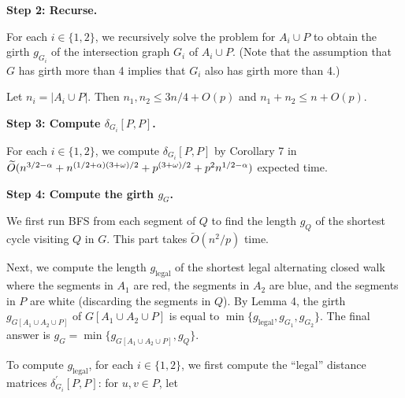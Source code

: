 \par\medskip\noindent\textbf{Step 2: Recurse.}\par
For each $i\in\{1,2\}$, we recursively solve the problem for $A_{i}\cup P$ to obtain the girth $g_{G_{i}}$ of the intersection graph $G_{i}$ of $A_{i}\cup P$. (Note that the assumption that $G$ has girth more than 4 implies that $G_{i}$ also has girth more than 4.)
\par
\par
Let $n_{i}=|A_{i}\cup P|$. Then $n_{1},n_{2}\leq 3n/4+O(p)$ and $n_{1}+n_{2}\leq n+O(p)$.
\par
\par
\par\medskip\noindent\textbf{Step 3: Compute $\delta_{G_{i}}[P,P]$.}\par
For each $i\in\{1,2\}$, we compute $\delta_{G_{i}}[P,P]$ by Corollary 7 in $\widetilde{O}(n^{3/2-\alpha}+n^{(1/2+\alpha)(3+\omega)/2}+p^{(3+\omega)/2}+p^{%
2}n^{1/2-\alpha})$ expected time.
\par
\par
\par\medskip\noindent\textbf{Step 4: Compute the girth $g_{G}$.}\par
We first run BFS from each segment of $Q$ to find the length $g_{Q}$ of the shortest cycle visiting $Q$ in $G$. This part takes $\widetilde{O}(n^{2}/p)$ time.
\par
\par
Next, we compute the length $g_{\textrm{legal}}$ of the shortest legal alternating closed walk where the segments in $A_{1}$ are red, the segments in $A_{2}$ are blue, and the segments in $P$ are white (discarding the segments in $Q$). By Lemma 4, the girth $g_{G[A_{1}\cup A_{2}\cup P]}$ of $G[A_{1}\cup A_{2}\cup P]$ is equal to $\min\{g_{\textrm{legal}},g_{G_{1}},g_{G_{2}}\}$. The final answer is $g_{G}=\min\{g_{G[A_{1}\cup A_{2}\cup P]},g_{Q}\}$.
\par
\par
To compute $g_{\textrm{legal}}$, for each $i\in\{1,2\}$, we first compute the “legal” distance matrices $\delta^{\prime}_{G_{i}}[P,P]$: for $u,v\in P$, let
